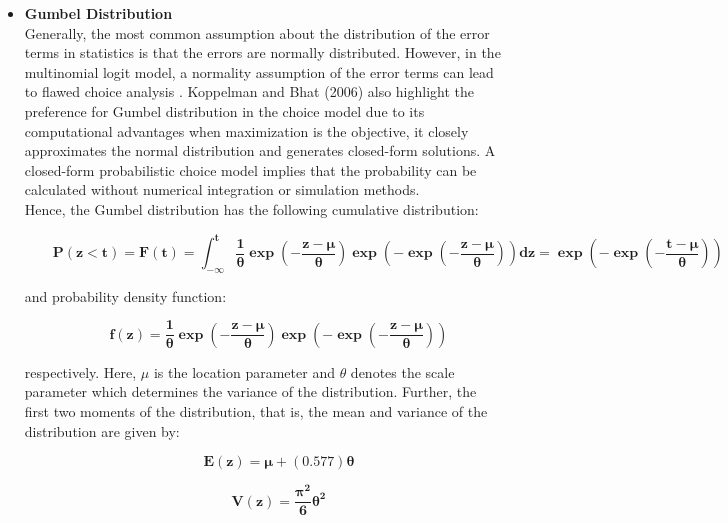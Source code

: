 \documentclass[a4paper,11pt]{article}
\begin{document}
    \begin{itemize}

        \item \textbf{Gumbel Distribution}\\

        Generally, the most common assumption about the distribution of the error terms in statistics is that the errors are normally distributed. However, in the multinomial logit model, a normality assumption of the error terms can lead to flawed choice analysis \cite{Koppelman&Bhat}. Koppelman and Bhat (2006) also highlight the preference for Gumbel distribution in the choice model due to its computational advantages when maximization is the objective, it closely approximates the normal distribution and generates closed-form solutions. A closed-form probabilistic choice model implies that the probability can be calculated without numerical integration or simulation methods.\\

        Hence, the Gumbel distribution has the following cumulative distribution:

        \begin{equation*}
            \qquad \mathbf{P(z<t) = F(t) = \int_{-\infty}^{t} \dfrac{1}{\theta}\exp{\left(-\dfrac{z-\mu}{\theta}\right)}\exp{\left(-\exp{\left(-\dfrac{z-\mu}{\theta}\right)}\right)}dz = \exp{\left(-\exp{\left(-\dfrac{t-\mu}{\theta}\right)}\right)}}
        \end{equation*}

         and probability density function:

         \begin{equation*}
             \qquad \mathbf{f(z) = \dfrac{1}{\theta}\exp{\left(-\dfrac{z-\mu}{\theta} \right)}\exp{\left(-\exp{\left(-\dfrac{z-\mu}{\theta}\right)}\right)}}
         \end{equation*}

         respectively. Here, $\mu$ is the location parameter and $\theta$ denotes the scale parameter which determines the variance of the distribution. Further, the first two moments of the distribution, that is, the mean and variance of the distribution are given by:

         \begin{equation*}
             \qquad \mathbf{E(z) = \mu + (0.577)\theta}
        \end{equation*}
        
        \begin{equation*}
             \qquad\mathbf{V(z) = \dfrac{\pi^{2}}{6}\theta^{2}}
         \end{equation*}


\end{itemize}
\end{document}
